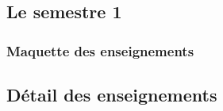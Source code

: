 \documentclass[10pt, a5paper]{report}
\begin{document}
\begin{spacing}{1.5}
%

\newpage

\subsection*{Le semestre 1}

\subsubsection*{Maquette des enseignements}



\subsection*{Détail des enseignements}


\end{spacing}
\end{document}
